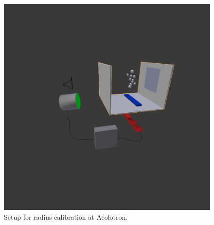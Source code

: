 			\begin{figure}
				\includegraphics[scale=0.2]{images/radius_setup.png}
				\caption{Setup for radius calibration at Aeolotron. }
				\label{fig:radius_calibration_setup}
			\end{figure}
			
